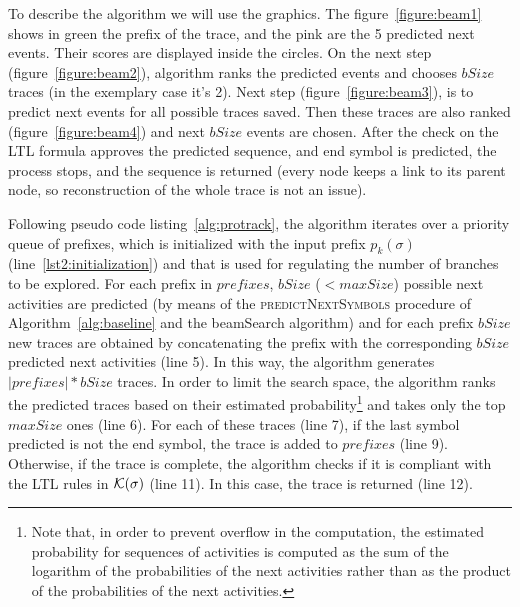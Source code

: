 To describe the algorithm we will use the graphics. The figure~\ref{figure:beam1} shows in green the prefix of the trace, and the pink are the 5 predicted next events. Their scores are displayed inside the circles. On the next step (figure~\ref{figure:beam2}), algorithm ranks the predicted events and chooses $bSize$ traces (in the exemplary case it's 2). Next step (figure~\ref{figure:beam3}), is to predict next events for all possible traces saved. Then these traces are also ranked (figure~\ref{figure:beam4}) and next $bSize$ events are chosen. After the check on the LTL formula approves the predicted sequence, and end symbol is predicted, the process stops, and the sequence is returned (every node keeps a link to its parent node, so reconstruction of the whole trace is not an issue).

Following pseudo code listing~\ref{alg:protrack}, the algorithm iterates over a priority queue of prefixes, which is initialized with the input prefix $p_k(\sigma)$ (line~\ref{lst2:initialization}) and that is used for regulating the number of branches to be explored. For each prefix in $prefixes$, $bSize$ ($< maxSize$) possible next activities are predicted (by means of the \textsc{predictNextSymbols} procedure of Algorithm~\ref{alg:baseline} and the beamSearch algorithm) and for each prefix $bSize$ new traces are obtained by concatenating the prefix with the corresponding $bSize$ predicted next activities (line 5). In this way, the algorithm generates $\left|prefixes\right|*bSize$ traces. In order to limit the search space, the algorithm ranks the predicted traces based on their estimated probability\footnote{Note that, in order to prevent overflow in the computation, the estimated probability for sequences of activities is computed as the sum of the logarithm of the probabilities of the next activities rather than as the product of the probabilities of the next activities.} and takes only the top $maxSize$ ones (line 6). For each of these traces (line 7), if the last symbol predicted is not the end symbol, the trace is added to $prefixes$ (line 9). Otherwise, if the trace is complete, the algorithm checks if it is compliant with the LTL rules in $\cal{K}(\sigma)$ (line 11). In this case, the trace is returned (line 12).
